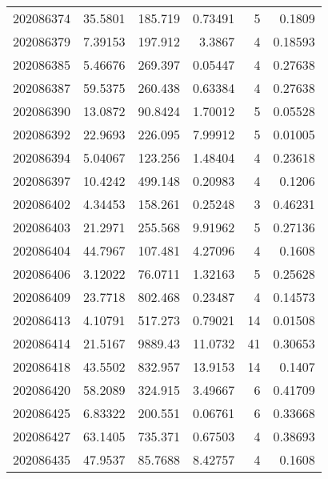 \begin{tabular}{rrrrrr}
 202086374 &         35.5801  &      185.719  &            0.73491 &           5 & 0.1809  \\
 202086379 &          7.39153 &      197.912  &            3.3867  &           4 & 0.18593 \\
 202086385 &          5.46676 &      269.397  &            0.05447 &           4 & 0.27638 \\
 202086387 &         59.5375  &      260.438  &            0.63384 &           4 & 0.27638 \\
 202086390 &         13.0872  &       90.8424 &            1.70012 &           5 & 0.05528 \\
 202086392 &         22.9693  &      226.095  &            7.99912 &           5 & 0.01005 \\
 202086394 &          5.04067 &      123.256  &            1.48404 &           4 & 0.23618 \\
 202086397 &         10.4242  &      499.148  &            0.20983 &           4 & 0.1206  \\
 202086402 &          4.34453 &      158.261  &            0.25248 &           3 & 0.46231 \\
 202086403 &         21.2971  &      255.568  &            9.91962 &           5 & 0.27136 \\
 202086404 &         44.7967  &      107.481  &            4.27096 &           4 & 0.1608  \\
 202086406 &          3.12022 &       76.0711 &            1.32163 &           5 & 0.25628 \\
 202086409 &         23.7718  &      802.468  &            0.23487 &           4 & 0.14573 \\
 202086413 &          4.10791 &      517.273  &            0.79021 &          14 & 0.01508 \\
 202086414 &         21.5167  &     9889.43   &           11.0732  &          41 & 0.30653 \\
 202086418 &         43.5502  &      832.957  &           13.9153  &          14 & 0.1407  \\
 202086420 &         58.2089  &      324.915  &            3.49667 &           6 & 0.41709 \\
 202086425 &          6.83322 &      200.551  &            0.06761 &           6 & 0.33668 \\
 202086427 &         63.1405  &      735.371  &            0.67503 &           4 & 0.38693 \\
 202086435 &         47.9537  &       85.7688 &            8.42757 &           4 & 0.1608  \\

\end{tabular}
